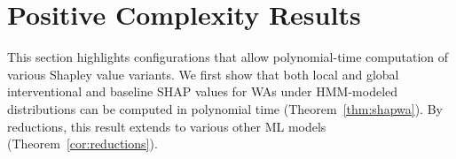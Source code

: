 \section{Positive Complexity Results} \label{sec:tractable}

This section highlights configurations that allow polynomial-time computation of various Shapley value variants. We first show that both local and global interventional and baseline SHAP values for WAs under HMM-modeled distributions can be computed in polynomial time (Theorem~\ref{thm:shapwa}). By reductions, this result extends to various other ML models (Theorem~\ref{cor:reductions}).


